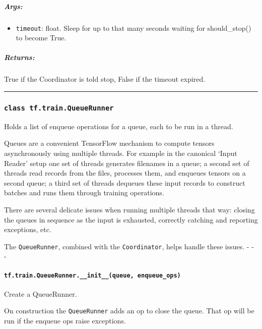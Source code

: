 \subparagraph{Args: }\label{args-25}

\begin{itemize}
\tightlist
\item
  \texttt{timeout}: float. Sleep for up to that many seconds waiting for
  should\_stop() to become True.
\end{itemize}

\subparagraph{Returns: }\label{returns-17}

True if the Coordinator is told stop, False if the timeout expired.

\begin{center}\rule{0.5\linewidth}{\linethickness}\end{center}

\subsubsection{\texorpdfstring{\texttt{class\ tf.train.QueueRunner}
}{class tf.train.QueueRunner }}\label{class-tf.train.queuerunner}

Holds a list of enqueue operations for a queue, each to be run in a
thread.

Queues are a convenient TensorFlow mechanism to compute tensors
asynchronously using multiple threads. For example in the canonical
`Input Reader' setup one set of threads generates filenames in a queue;
a second set of threads read records from the files, processes them, and
enqueues tensors on a second queue; a third set of threads dequeues
these input records to construct batches and runs them through training
operations.

There are several delicate issues when running multiple threads that
way: closing the queues in sequence as the input is exhausted, correctly
catching and reporting exceptions, etc.

The \texttt{QueueRunner}, combined with the \texttt{Coordinator}, helps
handle these issues. - - -

\paragraph{\texorpdfstring{\texttt{tf.train.QueueRunner.\_\_init\_\_(queue,\ enqueue\_ops)}
}{tf.train.QueueRunner.\_\_init\_\_(queue, enqueue\_ops) }}\label{tf.train.queuerunner.ux5fux5finitux5fux5fqueue-enqueueux5fops}

Create a QueueRunner.

On construction the \texttt{QueueRunner} adds an op to close the queue.
That op will be run if the enqueue ops raise exceptions.

